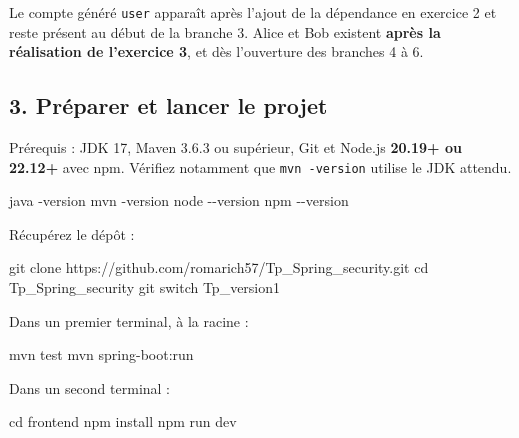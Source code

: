\documentclass[
  french,
  10pt,
  a4paper,
]{article}
\newenvironment{Shaded}{}{}
\newcommand{\AttributeTok}[1]{\textcolor[rgb]{0.49,0.56,0.16}{#1}}
\newcommand{\BuiltInTok}[1]{\textcolor[rgb]{0.00,0.50,0.00}{#1}}
\newcommand{\ExtensionTok}[1]{#1}
\newcommand{\FunctionTok}[1]{\textcolor[rgb]{0.02,0.16,0.49}{#1}}
\newcommand{\NormalTok}[1]{#1}
\begin{document}
Le compte généré \texttt{user} apparaît après l'ajout de la dépendance
en exercice 2 et reste présent au début de la branche 3. Alice et Bob
existent \textbf{après la réalisation de l'exercice 3}, et dès
l'ouverture des branches 4 à 6.

\subsection{3. Préparer et lancer le
projet}\label{pruxe9parer-et-lancer-le-projet}

Prérequis : JDK 17, Maven 3.6.3 ou supérieur, Git et Node.js
\textbf{20.19+ ou 22.12+} avec npm. Vérifiez notamment que
\texttt{mvn\ -version} utilise le JDK attendu.

\begin{Shaded}
\begin{Highlighting}[]
\ExtensionTok{java} \AttributeTok{{-}version}
\ExtensionTok{mvn} \AttributeTok{{-}version}
\ExtensionTok{node} \AttributeTok{{-}{-}version}
\ExtensionTok{npm} \AttributeTok{{-}{-}version}
\end{Highlighting}
\end{Shaded}

Récupérez le dépôt :

\begin{Shaded}
\begin{Highlighting}[]
\FunctionTok{git}\NormalTok{ clone https://github.com/romarich57/Tp\_Spring\_security.git}
\BuiltInTok{cd}\NormalTok{ Tp\_Spring\_security}
\FunctionTok{git}\NormalTok{ switch Tp\_version1}
\end{Highlighting}
\end{Shaded}

Dans un premier terminal, à la racine :

\begin{Shaded}
\begin{Highlighting}[]
\ExtensionTok{mvn}\NormalTok{ test}
\ExtensionTok{mvn}\NormalTok{ spring{-}boot:run}
\end{Highlighting}
\end{Shaded}

Dans un second terminal :

\begin{Shaded}
\begin{Highlighting}[]
\BuiltInTok{cd}\NormalTok{ frontend}
\ExtensionTok{npm}\NormalTok{ install}
\ExtensionTok{npm}\NormalTok{ run dev}
\end{Highlighting}
\end{Shaded}
\end{document}
